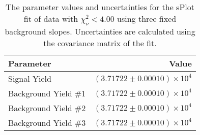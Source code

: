 
\begin{table}[ht]
    \begin{center}
        \begin{tabular}{lr}\toprule
            Parameter & Value \\\midrule
            Signal Yield & $(3.71722 \pm 0.00010) \times 10^{4}$ \\
            Background Yield $\#1$ & $(3.71722 \pm 0.00010) \times 10^{4}$ \\
            Background Yield $\#2$ & $(3.71722 \pm 0.00010) \times 10^{4}$ \\
            Background Yield $\#3$ & $(3.71722 \pm 0.00010) \times 10^{4}$ \\\bottomrule
        \end{tabular}
        \caption{The parameter values and uncertainties for the sPlot fit of data with $\chi^2_\nu < 4.00$ using three fixed background slopes. Uncertainties are calculated using the covariance matrix of the fit.}\label{tab:splot-fit-results-chisqdof-4.00-fixed-3}
    \end{center}
\end{table}
